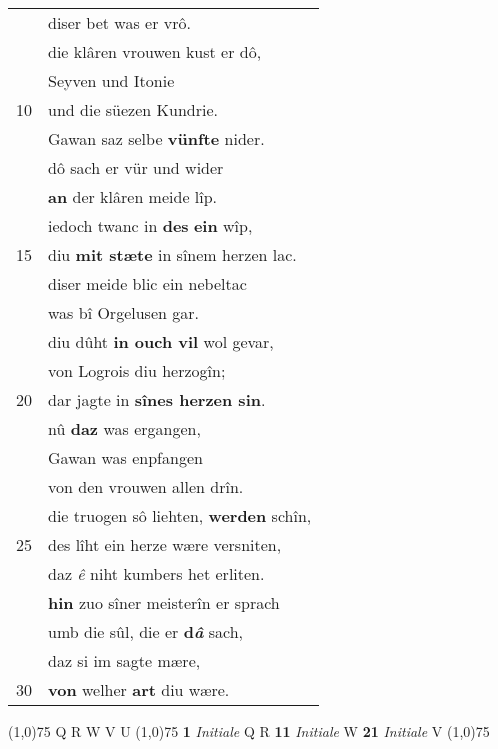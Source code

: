 \documentclass[8pt,a4paper,notitlepage]{article}
\begin{document}
\begin{table}[ht]
\begin{minipage}[t]{0.5\linewidth}
\begin{tabular}{rl}
 & diser bet was er vrô.\\ 
 & die klâren vrouwen kust er dô,\\ 
 & Seyven und Itonie\\ 
10 & und die süezen Kundrie.\\ 
 & Gawan saz selbe \textbf{vünfte} nider.\\ 
 & dô sach er vür und wider\\ 
 & \textbf{an} der klâren meide lîp.\\ 
 & iedoch twanc in \textbf{des} \textbf{ein} wîp,\\ 
15 & diu \textbf{mit stæte} in sînem herzen lac.\\ 
 & diser meide blic ein nebeltac\\ 
 & was bî Orgelusen gar.\\ 
 & diu dûht \textbf{in ouch vil} wol gevar,\\ 
 & von Logrois diu herzogîn;\\ 
20 & dar jagte in \textbf{sînes herzen sin}.\\ 
 & nû \textbf{daz} was ergangen,\\ 
 & Gawan was enpfangen\\ 
 & von den vrouwen allen drîn.\\ 
 & die truogen sô liehten, \textbf{werden} schîn,\\ 
25 & des lîht ein herze wære versniten,\\ 
 & daz \textit{ê} niht kumbers het erliten.\\ 
 & \textbf{hin} zuo sîner meisterîn er sprach\\ 
 & umb die sûl, die er \textbf{d\textit{â}} sach,\\ 
 & daz si im sagte mære,\\ 
30 & \textbf{von} welher \textbf{art} diu wære.\\ 
\end{tabular}
\scriptsize
\line(1,0){75} \newline
Q R W V U \newline
\line(1,0){75} \newline
\textbf{1} \textit{Initiale} Q R  \textbf{11} \textit{Initiale} W  \textbf{21} \textit{Initiale} V  \newline
\line(1,0){75} \newline

\end{minipage}
\end{table}
\end{document}
